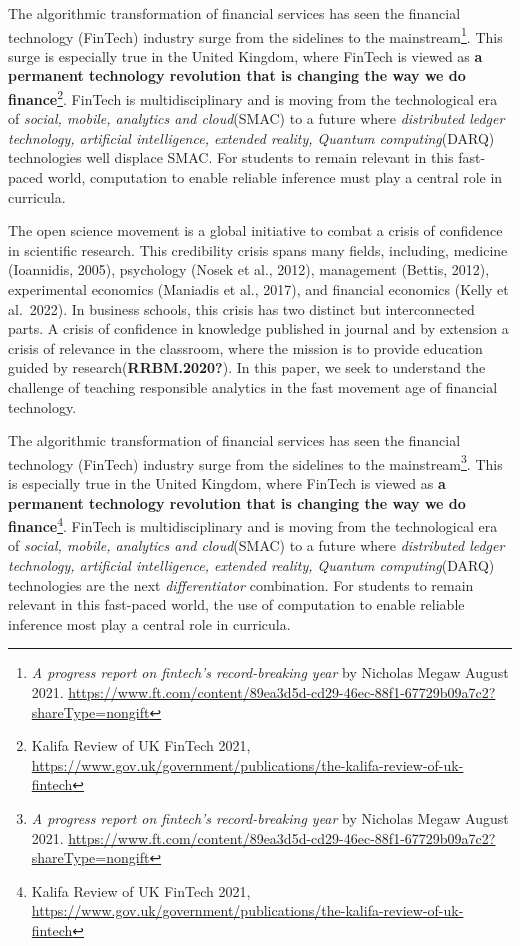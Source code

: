 \documentclass{article}
\begin{document}
The algorithmic transformation of financial services has seen the
financial technology (FinTech) industry surge from the sidelines to the
mainstream\footnote{\emph{A progress report on fintech's record-breaking
  year} by Nicholas Megaw August 2021.
  \url{https://www.ft.com/content/89ea3d5d-cd29-46ec-88f1-67729b09a7c2?shareType=nongift}}.
This surge is especially true in the United Kingdom, where FinTech is
viewed as \textbf{a permanent technology revolution that is changing the
way we do finance}\footnote{Kalifa Review of UK FinTech 2021,
  \url{https://www.gov.uk/government/publications/the-kalifa-review-of-uk-fintech}}.
FinTech is multidisciplinary and is moving from the technological era of
\emph{social, mobile, analytics and cloud}(SMAC) to a future where
\emph{distributed ledger technology, artificial intelligence, extended
reality, Quantum computing}(DARQ) technologies well displace SMAC. For
students to remain relevant in this fast-paced world, computation to
enable reliable inference must play a central role in curricula.

The open science movement is a global initiative to combat a crisis of
confidence in scientific research. This credibility crisis spans many
fields, including, medicine (Ioannidis, 2005), psychology (Nosek et al.,
2012), management (Bettis, 2012), experimental economics (Maniadis et
al., 2017), and financial economics (Kelly et al.~2022). In business
schools, this crisis has two distinct but interconnected parts. A crisis
of confidence in knowledge published in journal and by extension a
crisis of relevance in the classroom, where the mission is to provide
education guided by research(\textbf{RRBM.2020?}). In this paper, we
seek to understand the challenge of teaching responsible analytics in
the fast movement age of financial technology.

The algorithmic transformation of financial services has seen the
financial technology (FinTech) industry surge from the sidelines to the
mainstream\footnote{\emph{A progress report on fintech's record-breaking
  year} by Nicholas Megaw August 2021.
  \url{https://www.ft.com/content/89ea3d5d-cd29-46ec-88f1-67729b09a7c2?shareType=nongift}}.
This is especially true in the United Kingdom, where FinTech is viewed
as \textbf{a permanent technology revolution that is changing the way we
do finance}\footnote{Kalifa Review of UK FinTech 2021,
  \url{https://www.gov.uk/government/publications/the-kalifa-review-of-uk-fintech}}.
FinTech is multidisciplinary and is moving from the technological era of
\emph{social, mobile, analytics and cloud}(SMAC) to a future where
\emph{distributed ledger technology, artificial intelligence, extended
reality, Quantum computing}(DARQ) technologies are the next
\emph{differentiator} combination. For students to remain relevant in
this fast-paced world, the use of computation to enable reliable
inference most play a central role in curricula.
\end{document}
